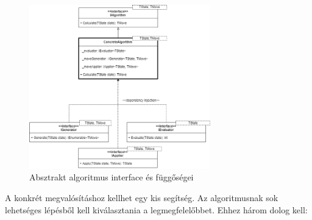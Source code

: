 \documentclass[twoside, a4paper, 12pt]{article}
\begin{document}
\begin{figure}[htbp]
	\centering
	\includegraphics[width=0.7\textwidth]{img/algorithmAbstractDiagram.png}
	\caption{Absztrakt algoritmus interface és függőségei}
	\label{fig:algorithmAbstractDiagram}
\end{figure}

A konkrét megvalósításhoz kellhet egy kis segítség. Az algoritmusnak sok lehetséges lépésből kell kiválasztania a legmegfelelőbbet. Ehhez három dolog kell:
\end{document}
